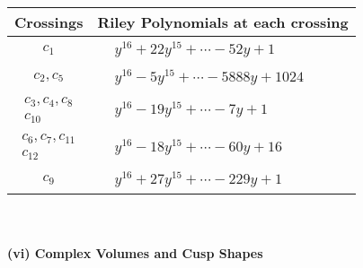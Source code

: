 \documentclass[1p]{elsarticle_modified}
\theoremstyle{definition}
\begin{document}
\begin{tabular}{m{50pt}|m{274pt}}
Crossings & \hspace{64pt}Riley Polynomials at each crossing \\
\hline $$\begin{aligned}c_{1}\end{aligned}$$&$\begin{aligned}
&y^{16}+22 y^{15}+\cdots-52 y+1
\end{aligned}$\\
\hline $$\begin{aligned}c_{2},c_{5}\end{aligned}$$&$\begin{aligned}
&y^{16}-5 y^{15}+\cdots-5888 y+1024
\end{aligned}$\\
\hline $$\begin{aligned}c_{3},c_{4},c_{8}\\c_{10}\end{aligned}$$&$\begin{aligned}
&y^{16}-19 y^{15}+\cdots-7 y+1
\end{aligned}$\\
\hline $$\begin{aligned}c_{6},c_{7},c_{11}\\c_{12}\end{aligned}$$&$\begin{aligned}
&y^{16}-18 y^{15}+\cdots-60 y+16
\end{aligned}$\\
\hline $$\begin{aligned}c_{9}\end{aligned}$$&$\begin{aligned}
&y^{16}+27 y^{15}+\cdots-229 y+1
\end{aligned}$\\
\hline
\end{tabular}\\~\\
\newpage\flushleft \textbf{(vi) Complex Volumes and Cusp Shapes}
\end{document}
